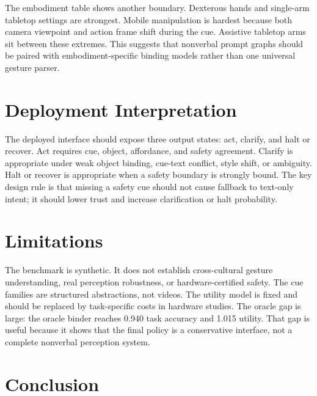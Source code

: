 \documentclass{article}
\newcommand{\method}{CEPG}
\begin{document}
\begin{table}[t]
\centering
\small
\resizebox{0.95\linewidth}{!}{}
\caption{\method{} by robot embodiment. Mobile manipulation is hardest because cue geometry and action context both move.}
\label{tab:embodiment}
\end{table}

The embodiment table shows another boundary. Dexterous hands and single-arm tabletop settings are strongest. Mobile manipulation is hardest because both camera viewpoint and action frame shift during the cue. Assistive tabletop arms sit between these extremes. This suggests that nonverbal prompt graphs should be paired with embodiment-specific binding models rather than one universal gesture parser.

\section{Deployment Interpretation}

The deployed interface should expose three output states: act, clarify, and halt or recover. Act requires cue, object, affordance, and safety agreement. Clarify is appropriate under weak object binding, cue-text conflict, style shift, or ambiguity. Halt or recover is appropriate when a safety boundary is strongly bound. The key design rule is that missing a safety cue should not cause fallback to text-only intent; it should lower trust and increase clarification or halt probability.

\section{Limitations}

The benchmark is synthetic. It does not establish cross-cultural gesture understanding, real perception robustness, or hardware-certified safety. The cue families are structured abstractions, not videos. The utility model is fixed and should be replaced by task-specific costs in hardware studies. The oracle gap is large: the oracle binder reaches 0.940 task accuracy and 1.015 utility. That gap is useful because it shows that the final policy is a conservative interface, not a complete nonverbal perception system.

\section{Conclusion}
\end{document}
